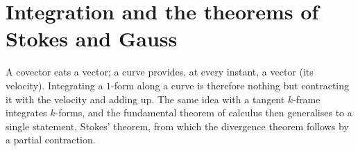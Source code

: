 \clearpage
\part{Integration and the theorems of Stokes and Gauss}\label{part:integration}

A covector eats a vector; a curve provides, at every instant, a vector (its velocity). Integrating a $1$-form along a curve is therefore
nothing but contracting it with the velocity and adding up. The same idea with a tangent $k$-frame integrates $k$-forms, and the
fundamental theorem of calculus then generalises to a single statement, Stokes' theorem, from which the divergence theorem follows by
a partial contraction.
